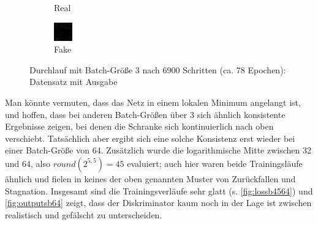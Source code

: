 \begin{figure}
\begin{subfigure}{.19\textwidth}
		\caption{Real}
	\end{subfigure}
	\begin{subfigure}{.19\textwidth}
		\centering
		\includegraphics[width=.9\linewidth,interpolate=false]{img/results/b03_fake}
		\caption{Fake}
	\end{subfigure}
	\caption{Durchlauf mit Batch-Größe 3 nach 6900 Schritten (ca. 78 Epochen): Datensatz mit Ausgabe}
	\label{fig:outputsb03}
\end{figure}

Man könnte vermuten, dass das Netz in einem lokalen Minimum angelangt ist, und hoffen, dass bei anderen Batch-Größen über 3 sich ähnlich konsistente Ergebnisse zeigen, bei denen die Schranke sich kontinuierlich nach oben verschiebt.
Tatsächlich aber ergibt sich eine solche Konsistenz erst wieder bei einer Batch-Größe von 64.
Zusätzlich wurde die logarithmische Mitte zwischen 32 und 64, also $ round(2^{5,5}) = 45 $ evaluiert; auch hier waren beide Trainingsläufe ähnlich und fielen in keines der oben genannten Muster von Zurückfallen und Stagnation.
Insgesamt sind die Trainingsverläufe sehr glatt (s. \autoref{fig:lossb4564}) und \autoref{fig:outputsb64} zeigt, dass der Diskriminator kaum noch in der Lage ist zwischen realistisch und gefälscht zu unterscheiden.


